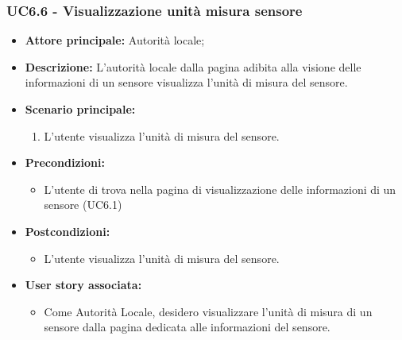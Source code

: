 \subsubsection{UC6.6 - Visualizzazione unità misura sensore}
\begin{itemize}
    \item \textbf{Attore principale:} Autorità locale;
    \item \textbf{Descrizione:} L’autorità locale dalla pagina adibita alla visione delle informazioni di un sensore visualizza l'unità di misura del sensore.
    \item \textbf{Scenario principale:}
          \begin{enumerate}
              \item L'utente visualizza l'unità di misura del sensore.
          \end{enumerate}
    \item \textbf{Precondizioni:}
          \begin{itemize}
              \item  L'utente di trova nella pagina di visualizzazione delle informazioni di un sensore (UC6.1)
          \end{itemize}
    \item \textbf{Postcondizioni:}
          \begin{itemize}
              \item  L'utente visualizza l'unità di misura del sensore.
          \end{itemize}
    \item \textbf{User story associata:}
          \begin{itemize}
              \item Come Autorità Locale, desidero visualizzare l'unità di misura di un sensore dalla pagina dedicata alle informazioni del sensore.
          \end{itemize}
\end{itemize}
